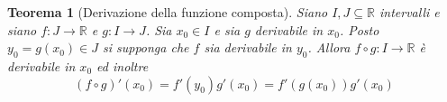 \documentclass[11pt]{book}
\newtheorem{theorem}{Teorema}[chapter]
\begin{document}
\begin{theorem}[Derivazione della funzione composta]
    Siano $I,J\subseteq\mathbb{R}$ intervalli e siano $f:J\rightarrow\mathbb{R}$ e $g:I\rightarrow J$.
    Sia $x_0\in I$ e sia $g$ derivabile in $x_0$.
    Posto $y_0=g(x_0)\in J$ si supponga che $f$ sia derivabile in $y_0$. Allora $f\circ g:I\rightarrow\mathbb{R}$ è 
    derivabile in $x_0$ ed inoltre 
    \begin{equation*}
        (f\circ g)'(x_0)=f'(y_0)g'(x_0)=f'(g(x_0))g'(x_0)
    \end{equation*}
\end{theorem}
\end{document}
